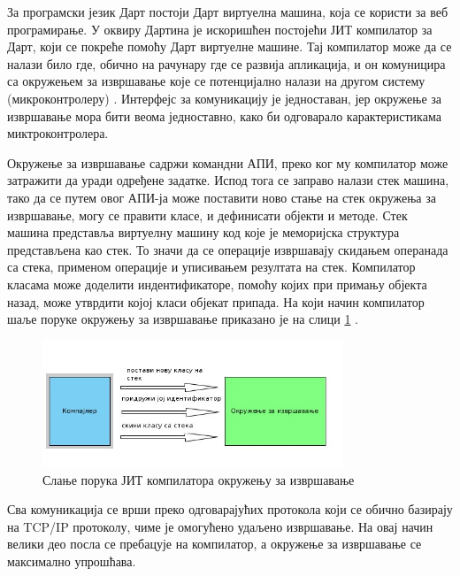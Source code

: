 \documentclass[12pt,oneside]{memoir}
\begin{document}
За програмски језик Дарт постоји Дарт виртуелна машина, која се користи за веб програмирање. У оквиру Дартина је искоришћен постојећи ЈИТ компилатор за Дарт, који се покреће помоћу Дарт виртуелне машине. Тај компилатор може да се налази било где, обично на рачунару где се развија апликација, и он комуницира са окружењем за извршавање које се потенцијално налази на другом систему (микроконтролеру) \cite{Dartino}. Интерфејс за комуникацију је једноставан, јер окружење за извршавање мора бити веома једноставно, како би одговарало карактеристикама миктроконтролера.

Окружење за извршавање садржи командни АПИ, преко ког му компилатор може затражити да уради одређене задатке. Испод тога се заправо налази стек машина, тако да се путем овог АПИ-ја може поставити ново стање на стек окружења за извршавање, могу се правити класе, и дефинисати објекти и методе. Стек машина представља виртуелну машину код које је меморијска структура представљена као стек. То значи да се операције извршавају скидањем операнада са стека, применом операције и уписивањем резултата на стек. Компилатор класама може доделити индентификаторе, помоћу којих при примању објекта назад, може утврдити којој класи објекат припада. На који начин компилатор шаље поруке окружењу за извршавање приказано је на слици \ref{fig:komunikacija} \cite{Dartino}.

\begin{figure}[!ht]
  \centering
  \includegraphics[width=0.8\textwidth]{compiler.jpg}
  \caption{Слање порука ЈИТ компилатора окружењу за извршавање}
  \label{fig:komunikacija}
\end{figure}

Сва комуникација се врши преко одговарајућих протокола који се обично базирају на TCP/IP протоколу, чиме је омогућено удаљено извршавање. На овај начин велики део посла се пребацује на компилатор, а окружење за извршавање се максимално упрошћава.
\end{document}
